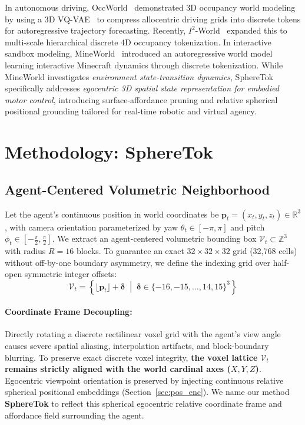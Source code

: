 \documentclass[10pt,twocolumn,letterpaper]{article}
\begin{document}
In autonomous driving, OccWorld~\cite{zheng2023occworld} demonstrated 3D occupancy world modeling by using a 3D VQ-VAE~\cite{van2017neural} to compress allocentric driving grids into discrete tokens for autoregressive trajectory forecasting. Recently, $I^2$-World~\cite{isquaredworld2025} expanded this to multi-scale hierarchical discrete 4D occupancy tokenization. In interactive sandbox modeling, MineWorld~\cite{mineworld2025} introduced an autoregressive world model learning interactive Minecraft dynamics through discrete tokenization. While MineWorld investigates \textit{environment state-transition dynamics}, SphereTok specifically addresses \textit{egocentric 3D spatial state representation for embodied motor control}, introducing surface-affordance pruning and relative spherical positional grounding tailored for real-time robotic and virtual agency.

\section{Methodology: SphereTok}

\subsection{Agent-Centered Volumetric Neighborhood}
Let the agent’s continuous position in world coordinates be $\mathbf{p}_t = (x_t, y_t, z_t) \in \mathbb{R}^3$, with camera orientation parameterized by yaw $\theta_t \in [-\pi, \pi]$ and pitch $\phi_t \in [-\frac{\pi}{2}, \frac{\pi}{2}]$. We extract an agent-centered volumetric bounding box $\mathcal{V}_t \subset \mathbb{Z}^3$ with radius $R = 16$ blocks. To guarantee an exact $32 \times 32 \times 32$ grid (32,768 cells) without off-by-one boundary asymmetry, we define the indexing grid over half-open symmetric integer offsets:
\begin{equation}
\mathcal{V}_t = \left\{ \lfloor\mathbf{p}_t\rfloor + \boldsymbol{\delta} \;\middle|\; \boldsymbol{\delta} \in \{-16, -15, \dots, 14, 15\}^3 \right\}
\end{equation}

\paragraph{Coordinate Frame Decoupling:} Directly rotating a discrete rectilinear voxel grid with the agent's view angle causes severe spatial aliasing, interpolation artifacts, and block-boundary blurring. To preserve exact discrete voxel integrity, \textbf{the voxel lattice $\mathcal{V}_t$ remains strictly aligned with the world cardinal axes ($X, Y, Z$)}. Egocentric viewpoint orientation is preserved by injecting continuous relative spherical positional embeddings (Section~\ref{sec:pos_enc}). We name our method \textbf{SphereTok} to reflect this spherical egocentric relative coordinate frame and affordance field surrounding the agent.
\end{document}

